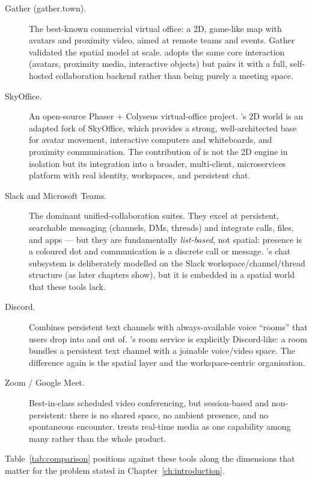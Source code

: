 \begin{description}
  \item[Gather (gather.town).] The best-known commercial virtual office: a 2D,
  game-like map with avatars and proximity video, aimed at remote teams and
  events. Gather validated the spatial model at scale. \voname{} adopts the same
  core interaction (avatars, proximity media, interactive objects) but pairs it
  with a full, self-hosted collaboration backend rather than being purely a
  meeting space.

  \item[SkyOffice.] An open-source Phaser + Colyseus virtual-office project.
  \voname{}'s 2D world is an adapted fork of SkyOffice, which provides a strong,
  well-architected base for avatar movement, interactive computers and
  whiteboards, and proximity communication. The contribution of \voname{} is not
  the 2D engine in isolation but its integration into a broader, multi-client,
  microservices platform with real identity, workspaces, and persistent chat.

  \item[Slack and Microsoft Teams.] The dominant unified-collaboration suites.
  They excel at persistent, searchable messaging (channels, DMs, threads) and
  integrate calls, files, and apps --- but they are fundamentally
  \emph{list-based}, not spatial: presence is a coloured dot and communication is
  a discrete call or message. \voname{}'s chat subsystem is deliberately modelled
  on the Slack workspace/channel/thread structure (as later chapters show), but
  it is embedded in a spatial world that these tools lack.

  \item[Discord.] Combines persistent text channels with always-available voice
  ``rooms'' that users drop into and out of. \voname{}'s room service is
  explicitly Discord-like: a room bundles a persistent text channel with a
  joinable voice/video space. The difference again is the spatial layer and the
  workspace-centric organisation.

  \item[Zoom / Google Meet.] Best-in-class scheduled video conferencing, but
  session-based and non-persistent: there is no shared space, no ambient
  presence, and no spontaneous encounter. \voname{} treats real-time media as one
  capability among many rather than the whole product.
\end{description}

Table~\ref{tab:comparison} positions \voname{} against these tools along the
dimensions that matter for the problem stated in Chapter~\ref{ch:introduction}.

